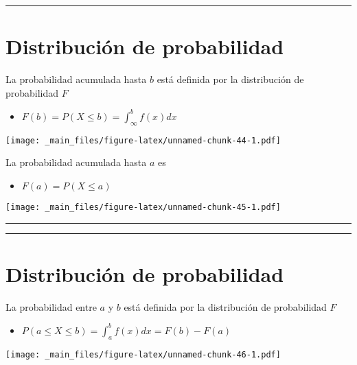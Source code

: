 \documentclass[
]{book}
\providecommand{\tightlist}{%
  \setlength{\itemsep}{0pt}\setlength{\parskip}{0pt}}
\begin{document}
\begin{center}\rule{0.5\linewidth}{0.5pt}\end{center}

\hypertarget{distribuciuxf3n-de-probabilidad-2}{%
\section{Distribución de probabilidad}\label{distribuciuxf3n-de-probabilidad-2}}

La probabilidad acumulada hasta \(b\) está definida por la distribución de probabilidad \(F\)

\begin{itemize}
\tightlist
\item
  \(F(b) = P(X \leq b)=\int_\infty^bf(x)dx\)
\end{itemize}

\texttt{[image: \_main\_files/figure-latex/unnamed-chunk-44-1.pdf]}

La probabilidad acumulada hasta \(a\) es

\begin{itemize}
\tightlist
\item
  \(F(a) = P(X \leq a)\)
\end{itemize}

\texttt{[image: \_main\_files/figure-latex/unnamed-chunk-45-1.pdf]}

\begin{center}\rule{0.5\linewidth}{0.5pt}\end{center}

\begin{center}\rule{0.5\linewidth}{0.5pt}\end{center}

\hypertarget{distribuciuxf3n-de-probabilidad-3}{%
\section{Distribución de probabilidad}\label{distribuciuxf3n-de-probabilidad-3}}

La probabilidad entre \(a\) y \(b\) está definida por la distribución de probabilidad \(F\)

\begin{itemize}
\tightlist
\item
  \(P(a\leq X \leq b) = \int_a^b f(x)dx=F(b)-F(a)\)
\end{itemize}

\texttt{[image: \_main\_files/figure-latex/unnamed-chunk-46-1.pdf]}
\end{document}
